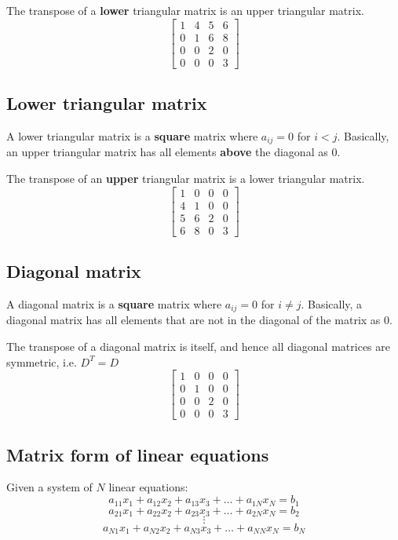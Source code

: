 \documentclass[11pt]{article}
\begin{document}
The transpose of a \textbf{lower} triangular matrix is an upper triangular matrix.
\begin{displaymath}
\begin{bmatrix}
1 & 4 & 5 & 6 \\
0 & 1 & 6 & 8 \\
0 & 0 & 2 & 0 \\
0 & 0 & 0 & 3
\end{bmatrix}
\end{displaymath}

\subsection{Lower triangular matrix}
\label{sec:org4f8e106}
A lower triangular matrix is a \textbf{square} matrix where \(a_{ij} = 0\) for \(i < j\). Basically, an upper triangular matrix has all elements \textbf{above} the diagonal as 0.

The transpose of an \textbf{upper} triangular matrix is a lower triangular matrix.
\begin{displaymath}
\begin{bmatrix}
1 & 0 & 0 & 0 \\
4 & 1 & 0 & 0 \\
5 & 6 & 2 & 0 \\
6 & 8 & 0 & 3
\end{bmatrix}
\end{displaymath}

 \newpage

\subsection{Diagonal matrix}
\label{sec:orga917661}
A diagonal matrix is a \textbf{square} matrix where \(a_{ij} = 0\) for \(i \neq j\). Basically, a diagonal matrix has all elements that are not in the diagonal of the matrix as 0.

The transpose of a diagonal matrix is itself, and hence all diagonal matrices are symmetric, i.e. \(D^{T} = D\)
\begin{displaymath}
\begin{bmatrix}
1 & 0 & 0 & 0 \\
0 & 1 & 0 & 0 \\
0 & 0 & 2 & 0 \\
0 & 0 & 0 & 3
\end{bmatrix}
\end{displaymath}

\subsection{Matrix form of linear equations}
\label{sec:orga3a708b}
Given a system of \(N\) linear equations:
\[a_{11}x_1 + a_{12}x_2 + a_{13}x_3 + \ldots + a_{1N}x_{N} = b_1\]
\[a_{21}x_1 + a_{22}x_2 + a_{23}x_3 + \ldots + a_{2N}x_{N} = b_2\]
\[\vdots\]
\[a_{N1}x_1 + a_{N2}x_2 + a_{N3}x_3 + \ldots + a_{NN}x_{N} = b_N\]
\end{document}
